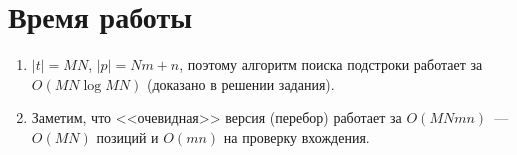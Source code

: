 \documentclass[a4paper]{article}
\begin{document}
\section{Время работы}
\begin{enumerate}
\item $|t|=MN$, $|p|=Nm+n$, поэтому алгоритм поиска подстроки работает за $O(MN\log MN)$ (доказано в решении задания).
\item Заметим, что <<очевидная>> версия (перебор) работает за $O(MNmn)$~--- $O(MN)$ позиций и $O(mn)$ на проверку вхождения.
\end{enumerate}
\end{document}
